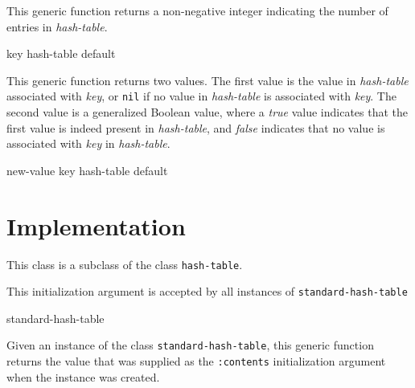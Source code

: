 This generic function returns a non-negative integer indicating the
number of entries in \textit{hash-table}.

{\small{} {key hash-table \optional default}
}

This generic function returns two values.  The first value is the
value in \textit{hash-table} associated with \textit{key}, or
\texttt{nil} if no value in \textit{hash-table} is associated with
\textit{key}.  The second value is a generalized Boolean value, where
a \textsl{true} value indicates that the first value is indeed present
in \textit{hash-table}, and \textsl{false} indicates that no value is
associated with \textit{key} in \textit{hash-table}.

{\small{} {new-value key hash-table \optional default}
}

\section{Implementation}


This class is a subclass of the class \texttt{hash-table}.


This initialization argument is accepted by all instances of
\texttt{standard-hash-table}

{\small{} {standard-hash-table}
}

Given an instance of the class \texttt{standard-hash-table}, this
generic function returns the value that was supplied as the
\texttt{:contents} initialization argument when the instance was
created.
